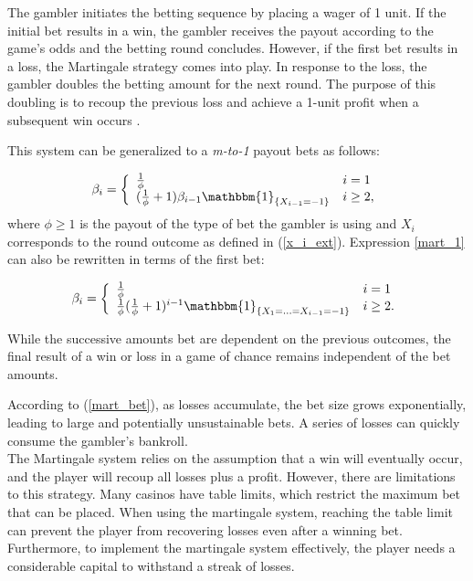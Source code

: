 \documentclass[11pt,twoside]{article}
\numberwithin{Theorem}{section}
\numberwithin{Definition}{section}
\numberwithin{Lemma}{section}
\numberwithin{Algorithm}{section}
\numberwithin{equation}{section}
\def\1{\mathbbm{1}}
\begin{document}
The gambler initiates the betting sequence by placing a wager of 1 unit. If the initial bet results in a win, the gambler receives the payout according to the game's odds and the betting round concludes. However, if the first bet results in a loss, the Martingale strategy comes into play. In response to the loss, the gambler doubles the betting amount for the next round. The purpose of this doubling is to recoup the previous loss and achieve a 1-unit profit when a subsequent win occurs \cite{chances}.

This system can be generalized to a \textit{m-to-1} payout bets as follows:

\begin{equation}\label{mart_1}
\beta_{i} = \left\{
\begin{array}{ll}
\frac{1}{\phi} & i = 1\\
(\frac{1}{\phi} +1)\beta_{i-1}\1_{\{X_{i-1} = -1\}}  &  i\geq 2,
\end{array}
\right.
\end{equation}
where $\phi \geq 1$ is the payout of the type of bet the gambler is using and $X_{i}$ corresponds to the round outcome as defined in (\ref{x_i_ext}). Expression \ref{mart_1} can also be rewritten in terms of the first bet:

\begin{equation}
\beta_{i} = \left\{
\begin{array}{ll}
\frac{1}{\phi}  & i = 1\\
\frac{1}{\phi}(\frac{1}{\phi} +1)^{i-1}\1_{\{X_{1} =...=X_{i-1} = -1\}} &  i\geq 2.\label{mart_bet}\\
\end{array}
\right.
\end{equation}

While the successive amounts bet are dependent on the previous outcomes, the final result of a win or loss in a game of chance remains independent of the bet amounts. 

According to (\ref{mart_bet}), as losses accumulate, the bet size grows exponentially, leading to large and potentially unsustainable bets. A series of losses can quickly consume the gambler's bankroll.\\

The Martingale system relies on the assumption that a win will eventually occur, and the player will recoup all losses plus a profit. However, there are limitations to this strategy. Many casinos have table limits, which restrict the maximum bet that can be placed. When using the martingale system, reaching the table limit can prevent the player from recovering losses even after a winning bet. Furthermore, to implement the martingale system effectively, the player needs a considerable capital to withstand a streak of losses. \\
\end{document}
